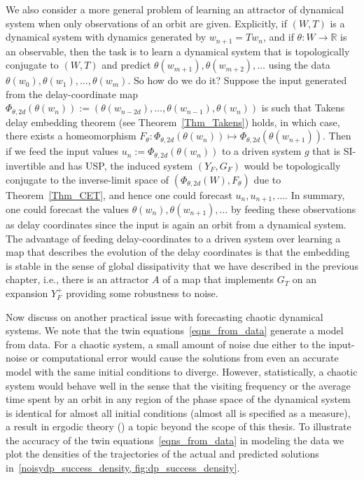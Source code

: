 We also consider a more general problem of learning an attractor of dynamical system when only observations of an orbit are given. Explicitly, if $(W,T)$ is a dynamical system with dynamics generated by $w_{n+1}=Tw_n$, and if $\theta:W \to \mathbb{R}$ is an observable, then the task is to learn a dynamical system that is topologically conjugate to $(W,T)$ and predict $\theta(w_{m+1}),\theta(w_{m+2}),\ldots$ using the data $\theta(w_{0}),\theta(w_{1}),\ldots,\theta(w_{m})$.  So how do we do it?
Suppose the input generated from the delay-coordinate map $\Phi_{\theta,2d}(\theta(w_{n})) := (\theta(w_{n-2d}),\ldots,\theta(w_{n-1}),\theta(w_{n}))$ is such that Takens delay embedding theorem (see Theorem~\ref{Thm_Takens}) holds, in which case, there exists a homeomorphism  $F_\theta: \Phi_{\theta,2d}(\theta(w_{n})) \mapsto \Phi_{\theta,2d}(\theta(w_{n+1}))$. Then if we feed  the input values $u_n := \Phi_{\theta,2d}(\theta(w_{n}))$ to a driven system $g$ that is SI-invertible and has USP, the induced system $(Y_F,G_F)$ would be topologically conjugate to the inverse-limit space of
$(\Phi_{\theta,2d}(W), F_\theta)$ due to Theorem~\ref{Thm_CET}, and hence one could forecast $u_n,u_{n+1},\ldots$. In summary, one could forecast  the values $\theta(w_n), \theta(w_{n+1}),\ldots$ by feeding these observations as delay coordinates since the input is again an orbit from a dynamical system. 
The advantage of feeding delay-coordinates to a driven system  over learning a map that describes the evolution of the delay coordinates is that the embedding is stable in the sense of global dissipativity that we have described in the previous chapter, i.e., there is an attractor $A$ of a map that implements $G_T$ on an expansion $Y_F^+$ providing some robustness to noise. 

Now discuss on another practical issue with forecasting chaotic dynamical systems.  
We note that the twin equations~\ref{eqns_from_data} generate a model from data. For a chaotic system, a small amount of noise due either to the input-noise or computational error would cause the solutions from even an accurate model with the same initial conditions to diverge. However, statistically, a chaotic system would behave well in the sense that the visiting frequency or the average time spent by an orbit in any region of the phase space of the dynamical system is identical for almost all initial conditions (almost all is specified as a measure), a result in ergodic theory (\cite{wikiErgodicTheory}) a topic beyond the scope of this thesis.
To illustrate the accuracy of the twin  equations~\ref{eqns_from_data} in modeling the data we plot the densities of the trajectories of the actual and predicted solutions in~\ref{noisydp_success_density, fig:dp_success_density}. 

